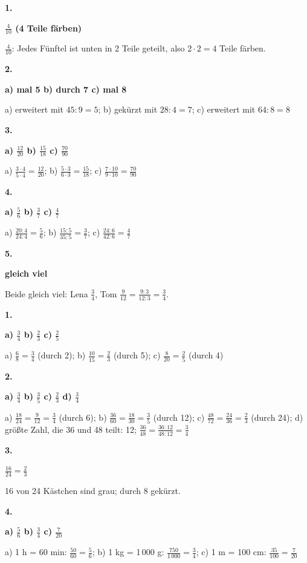 \documentclass[11pt]{article}
\newcommand{\lsg}[3]{\par\noindent\begin{minipage}[t]{9mm}\textbf{#1}\end{minipage}%
  \begin{minipage}[t]{52mm}\raggedright\bfseries\boldmath #2\end{minipage}\hspace{3mm}%
  \begin{minipage}[t]{\dimexpr\linewidth-64mm\relax}\raggedright\small #3\end{minipage}\par\vspace{4pt}}
\begin{document}
\par\smallskip
{}\par
\par\Needspace{25mm}\vspace{6pt}\noindent\colorbox{black!12}{}\hspace{2mm}{\bfseries Erweitern und kürzen}\par\vspace{4pt}
\lsg{1.}{$\frac{4}{10}$ (4 Teile färben)}{$\frac{4}{10}$: Jedes Fünftel ist unten in 2 Teile geteilt, also $2 \cdot 2 = 4$ Teile färben.}
\lsg{2.}{a) mal 5 \quad b) durch 7 \quad c) mal 8}{a) erweitert mit $45 : 9 = 5$; b) gekürzt mit $28 : 4 = 7$; c) erweitert mit $64 : 8 = 8$}
\lsg{3.}{a) $\frac{12}{20}$ \quad b) $\frac{15}{18}$ \quad c) $\frac{70}{90}$}{a) $\frac{3 \cdot 4}{5 \cdot 4} = \frac{12}{20}$; b) $\frac{5 \cdot 3}{6 \cdot 3} = \frac{15}{18}$; c) $\frac{7 \cdot 10}{9 \cdot 10} = \frac{70}{90}$}
\lsg{4.}{a) $\frac{5}{6}$ \quad b) $\frac{3}{7}$ \quad c) $\frac{4}{7}$}{a) $\frac{20 : 4}{24 : 4} = \frac{5}{6}$; b) $\frac{15 : 5}{35 : 5} = \frac{3}{7}$; c) $\frac{24 : 6}{42 : 6} = \frac{4}{7}$}
\lsg{5.}{gleich viel}{Beide gleich viel: Lena $\frac{3}{4}$, Tom $\frac{9}{12} = \frac{9 : 3}{12 : 3} = \frac{3}{4}$.}
\par\Needspace{25mm}\vspace{6pt}\noindent\colorbox{black!12}{}\hspace{2mm}{\bfseries Vollständig kürzen}\par\vspace{4pt}
\lsg{1.}{a) $\frac{3}{4}$ \quad b) $\frac{2}{3}$ \quad c) $\frac{2}{5}$}{a) $\frac{6}{8} = \frac{3}{4}$ (durch 2); b) $\frac{10}{15} = \frac{2}{3}$ (durch 5); c) $\frac{8}{20} = \frac{2}{5}$ (durch 4)}
\lsg{2.}{a) $\frac{3}{4}$ \quad b) $\frac{3}{5}$ \quad c) $\frac{2}{3}$ \quad d) $\frac{3}{4}$}{a) $\frac{18}{24} = \frac{9}{12} = \frac{3}{4}$ (durch 6); b) $\frac{36}{60} = \frac{18}{30} = \frac{3}{5}$ (durch 12); c) $\frac{48}{72} = \frac{24}{36} = \frac{2}{3}$ (durch 24); d) größte Zahl, die 36 und 48 teilt: 12; $\frac{36}{48} = \frac{36 : 12}{48 : 12} = \frac{3}{4}$}
\lsg{3.}{$\frac{16}{24} = \frac{2}{3}$}{16 von 24 Kästchen sind grau; durch 8 gekürzt.}
\lsg{4.}{a) $\frac{5}{6}$ \quad b) $\frac{3}{4}$ \quad c) $\frac{7}{20}$}{a) 1 h = 60 min: $\frac{50}{60} = \frac{5}{6}$; b) 1 kg = 1\,000 g: $\frac{750}{1\,000} = \frac{3}{4}$; c) 1 m = 100 cm: $\frac{35}{100} = \frac{7}{20}$}
\end{document}
